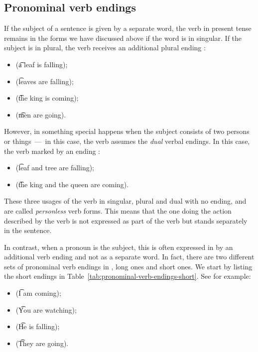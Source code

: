 \subsection{Pronominal verb endings}
If the subject of a \quenya sentence is given by a separate word, the \quenya
verb in present tense remains in the forms we have discussed above if the word
is in singular. If the subject is in plural, the verb receives an additional
plural ending :
\begin{itemize}
  \item {} (\t{a leaf is falling});
  \item {} (\t{leaves are falling});
  \item {} (\t{the king is coming});
  \item {} (\t{men are going}).
\end{itemize}
However, in \quenya something special happens when the subject consists of two
persons or things~---~in this case, the \quenya verb assumes the \emph{dual}
verbal endings. In this case, the verb marked by an ending :
\begin{itemize}
  \item {} (\t{leaf and tree are falling});
  \item {} (\t{the king and the queen are
  coming}).
\end{itemize}
These three usages of the verb in singular, plural and dual with no ending,
 and  are called \emph{personless} verb forms. This means that the
one doing the action described by the verb is not expressed as part of the verb but
stands separately in the sentence.

In contrast, when a pronoun is the subject, this is often expressed in \quenya
by an additional verb ending and not as a separate word. In fact, there are two
different sets of pronominal verb endings in \quenya, long ones and short ones.
We start by listing the short endings in
Table~\ref{tab:pronominal-verb-endings-short}.
See for example:
\begin{itemize}
  \item {} (\t{I am coming});
  \item {} (\t{You are watching});
  \item {} (\t{He is falling});
  \item {} (\t{They are going}).
\end{itemize}

